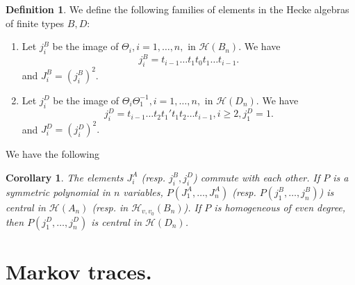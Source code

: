 \documentclass[11pt,leqno]{article}
\newtheorem{corollary}[theorem]{Corollary}%
\theoremstyle{definition}
\newtheorem{definition}[theorem]{Definition}%
\theoremstyle{definition}
\theoremstyle{remark}
\newcommand{\He}{\mathcal{H}}
\begin{document}
\begin{definition}
  We define the following families of elements in the Hecke algebras of finite types $B, D$:
  \begin{enumerate}[]
  \item[(B).] Let $j^B_i$ be the image of $\Theta_i, i = 1, \dots, n,$ in $\He(B_{n})$. We have \[j^B_{i} = t_{i-1}\dots t_1t_0t_1 \dots t_{i-1}.\]
    and $J^B_i = (j^B_i)^2.$
  \item[(D).] Let $j^D_i$ be the image of $\Theta_i\Theta_1^{-1}, i = 1, \dots, n,$ in $\He(D_{n})$. We have \[j^D_{i} = t_{i-1}\dots t_2t_1't_1t_2 \dots t_{i-1}, i \geq 2, j_1^D = 1.\]
    and $J^D_i = (j^D_i)^2.$
  \end{enumerate}
\end{definition}
We have the following
\begin{corollary}
 \label{sec:jucys-murphy-central} 
 The elements $J^A_i$ (resp. $j^B_i, j^D_i$) commute with each other. If $P$ is a symmetric polynomial in $n$ variables, $P(J^A_1, \dots, J^A_n)$ (resp. $P(j^B_1, \dots, j^B_n)$) is central in $\He(A_n)$ (resp. in $\He_{v,v_0}(B_n)$). If $P$ is homogeneous of even degree, then $P(j^D_1, \dots, j^D_n)$ is central in $\He(D_n)$. 
\end{corollary}
\section{Markov traces.}
\label{sec:markov-traces-1}
\end{document}
